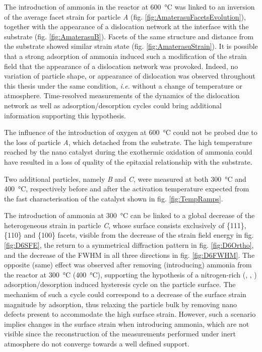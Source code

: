 The introduction of ammonia in the reactor at \qty{600}{\degreeCelsius} was linked to an inversion of the average facet strain for particle \textit{A} (fig. \ref{fig:AmaterasuFacetsEvolution}), together with the appearance of a dislocation network at the interface with the substrate (fig. \ref{fig:AmaterasuB}).
Facets of the same structure and distance from the substrate showed similar strain state (fig. \ref{fig:AmaterasuStrain}).
It is possible that a strong adsorption of ammonia induced such a modification of the strain field that the appearance of a dislocation network was provoked.
Indeed, no variation of particle shape, or appearance of dislocation was observed throughout this thesis under the same condition, \textit{i.e.} without a change of temperature or atmosphere.
Time-resolved measurements of the dynamics of the dislocation network as well as adsorption/desorption cycles could bring additional information supporting this hypothesis.

The influence of the introduction of oxygen at \qty{600}{\degreeCelsius} could not be probed due to the loss of particle \textit{A}, which detached from the substrate.
The high temperature reached by the nano catalyst during the exothermic oxidation of ammonia \parencite{Hatscher2008} could have resulted in a loss of quality of the epitaxial relationship with the substrate.

Two additional particles, namely \textit{B} and \textit{C}, were measured at both \qty{300}{\degreeCelsius} and \qty{400}{\degreeCelsius}, respectively before and after the activation temperature expected from the fast characterisation of the catalyst shown in fig. \ref{fig:TempRamps}.

The introduction of ammonia at \qty{300}{\degreeCelsius} can be linked to a global decrease of the heterogeneous strain in particle \textit{C}, whose surface consists exclusively of \{111\}, \{110\} and \{100\} facets, visible from the decrease of the strain field energy in fig. \ref{fig:D6SFE}, the return to a symmetrical diffraction pattern in fig. \ref{fig:D6Ortho}, and the decrease of the FWHM in all three directions in fig. \ref{fig:D6FWHM}.
The opposite (same) effect was observed after removing (introducing) ammonia from the reactor at \qty{300}{\degreeCelsius} (\qty{400}{\degreeCelsius}), supporting the hypothesis of a nitrogen-rich (, , ) adsorption/desorption induced hysteresis cycle on the particle surface.
The mechanism of such a cycle could correspond to a decrease of the surface strain magnitude by adsorption, thus relaxing the particle bulk by removing nano defects present to accommodate the high surface strain.
However, such a scenario implies changes in the surface strain when introducing ammonia, which are not visible since the reconstruction of the measurements performed under inert atmosphere do not converge towards a well defined support.

